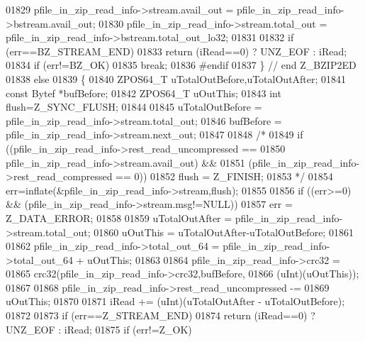 \begin{DoxyCode}
01829             pfile\_in\_zip\_read\_info->stream.avail\_out = pfile\_in\_zip\_read\_info->bstream.avail\_out;
01830             pfile\_in\_zip\_read\_info->stream.total\_out = pfile\_in\_zip\_read\_info->bstream.total\_out\_lo32;
01831 
01832             \textcolor{keywordflow}{if} (err==BZ\_STREAM\_END)
01833               \textcolor{keywordflow}{return} (iRead==0) ? UNZ\_EOF : iRead;
01834             \textcolor{keywordflow}{if} (err!=BZ\_OK)
01835               \textcolor{keywordflow}{break};
01836 \textcolor{preprocessor}{#endif}
01837         \} \textcolor{comment}{// end Z\_BZIP2ED}
01838         \textcolor{keywordflow}{else}
01839         \{
01840             ZPOS64\_T uTotalOutBefore,uTotalOutAfter;
01841             \textcolor{keyword}{const} Bytef *bufBefore;
01842             ZPOS64\_T uOutThis;
01843             \textcolor{keywordtype}{int} flush=Z\_SYNC\_FLUSH;
01844 
01845             uTotalOutBefore = pfile\_in\_zip\_read\_info->stream.total\_out;
01846             bufBefore = pfile\_in\_zip\_read\_info->stream.next\_out;
01847 
01848             \textcolor{comment}{/*}
01849 \textcolor{comment}{            if ((pfile\_in\_zip\_read\_info->rest\_read\_uncompressed ==}
01850 \textcolor{comment}{                     pfile\_in\_zip\_read\_info->stream.avail\_out) &&}
01851 \textcolor{comment}{                (pfile\_in\_zip\_read\_info->rest\_read\_compressed == 0))}
01852 \textcolor{comment}{                flush = Z\_FINISH;}
01853 \textcolor{comment}{            */}
01854             err=inflate(&pfile\_in\_zip\_read\_info->stream,flush);
01855 
01856             \textcolor{keywordflow}{if} ((err>=0) && (pfile\_in\_zip\_read\_info->stream.msg!=NULL))
01857               err = Z\_DATA\_ERROR;
01858 
01859             uTotalOutAfter = pfile\_in\_zip\_read\_info->stream.total\_out;
01860             uOutThis = uTotalOutAfter-uTotalOutBefore;
01861 
01862             pfile\_in\_zip\_read\_info->total\_out\_64 = pfile\_in\_zip\_read\_info->total\_out\_64 + uOutThis;
01863 
01864             pfile\_in\_zip\_read\_info->crc32 =
01865                 crc32(pfile\_in\_zip\_read\_info->crc32,bufBefore,
01866                         (uInt)(uOutThis));
01867 
01868             pfile\_in\_zip\_read\_info->rest\_read\_uncompressed -=
01869                 uOutThis;
01870 
01871             iRead += (uInt)(uTotalOutAfter - uTotalOutBefore);
01872 
01873             \textcolor{keywordflow}{if} (err==Z\_STREAM\_END)
01874                 \textcolor{keywordflow}{return} (iRead==0) ? UNZ\_EOF : iRead;
01875             \textcolor{keywordflow}{if} (err!=Z\_OK)

\end{DoxyCode}

